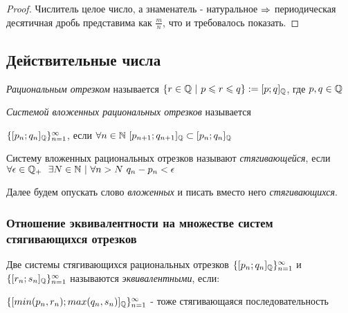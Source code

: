 \begin{proof}
    Числитель целое число, а знаменатель - натуральное $\Rightarrow$ периодическая десятичная дробь представима как $\frac{m}{n}$, что и требовалось показать.
\end{proof}

\subsection{Действительные числа}



\begin{definition}
    \textit{Рациональным отрезком} называется $\{r \in \mathbb{Q}\ |\ p \leqslant r \leqslant q\} := [p; q]_{\mathbb{Q}}$, где $p, q \in \mathbb{Q}$
\end{definition}

\begin{definition}
    \textit{Системой вложенных рациональных отрезков} называется 
    
    $\{[p_n;q_n]_{\mathbb{Q}}\}_{n = 1}^\infty$, если $\forall n \in \mathbb{N}\ [p_{n + 1}; q_{n + 1}]_{\mathbb{Q}} \subset [p_n; q_n]_{\mathbb{Q}}$
\end{definition}

\begin{definition}
    Систему вложенных рациональных отрезков называют \textit{стягивающейся}, если $\forall \epsilon \in \mathbb{Q}_+\ \ \exists N \in \mathbb{N}\ |\ \forall n > N\ q_n - p_n < \epsilon$
    
    Далее будем опускать слово \textit{вложенных} и писать вместо него \textit{стягивающихся}.
\end{definition}

\subsubsection{Отношение эквивалентности на множестве систем стягивающихся отрезков}

\begin{definition}
    Две системы стягивающихся рациональных отрезков $\{[p_n; q_n]_{\mathbb{Q}}\}_{n = 1}^\infty$ и $\{[r_n; s_n]_{\mathbb{Q}}\}_{n = 1}^\infty$ называются \textit{эквивалентными}, если:
    
    $\{[min(p_n, r_n); max(q_n, s_n)]_{\mathbb{Q}}\}_{n = 1}^\infty$ - тоже стягивающаяся последовательность
\end{definition}

